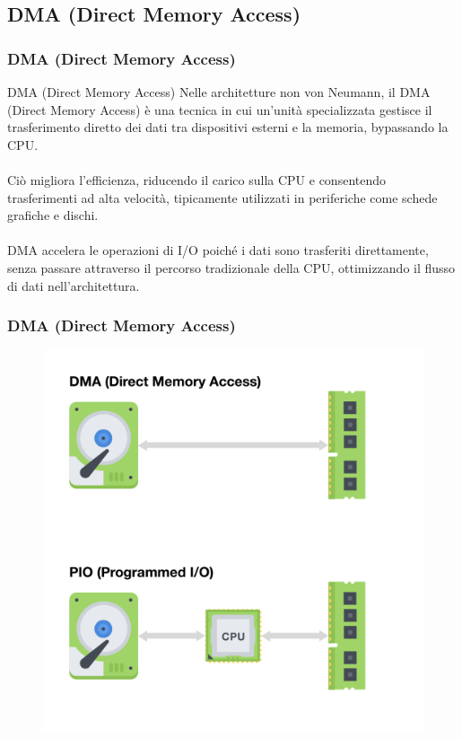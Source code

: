 \subsection[DMA (Direct Memory Access)]{DMA (Direct Memory Access)}
\begin{frame}
	\frametitle{ DMA (Direct Memory Access)}
	
	\begin{block}{DMA (Direct Memory Access)}
		Nelle architetture non von Neumann, il DMA (Direct Memory Access) è una tecnica in cui un'unità specializzata gestisce il trasferimento diretto dei dati tra dispositivi esterni e la memoria, bypassando la CPU.\\~\\
		Ciò migliora l'efficienza, riducendo il carico sulla CPU e consentendo trasferimenti ad alta velocità, tipicamente utilizzati in periferiche come schede grafiche e dischi.\\~\\
		DMA accelera le operazioni di I/O poiché i dati sono trasferiti direttamente, senza passare attraverso il percorso tradizionale della CPU, ottimizzando il flusso di dati nell'architettura.
	\end{block}
	
\end{frame}


\begin{frame}
	\frametitle{ DMA (Direct Memory Access)}
	
	\begin{figure}[!htbp]
		\centering 
		\includegraphics[width=0.6\linewidth]{images/7_pipeline/dma.pdf}
	\end{figure}
\end{frame}




